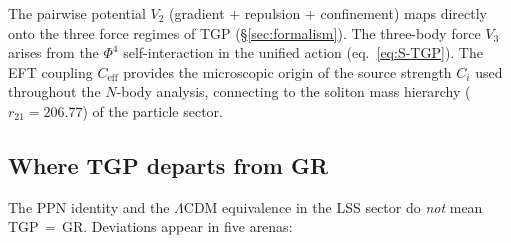 \begin{remark}\label{rem:nbody-connection}
The pairwise potential $V_{2}$ (gradient + repulsion + confinement)
maps directly onto the three force regimes of TGP
(\S\ref{sec:formalism}).  The three-body force $V_{3}$ arises from
the $\Phi^{4}$ self-interaction in the unified action
(eq.~\ref{eq:S-TGP}).  The EFT coupling $C_{\mathrm{eff}}$
provides the microscopic origin of the source strength $C_{i}$
used throughout the $N$-body analysis, connecting to the soliton
mass hierarchy ($r_{21}=206.77$) of the particle sector.
\end{remark}

\subsection{Where TGP departs from GR}\label{ssec:departures}

The PPN identity and the $\Lambda$CDM equivalence in the LSS sector
do \emph{not} mean TGP\,$=$\,GR.
Deviations appear in five arenas:

